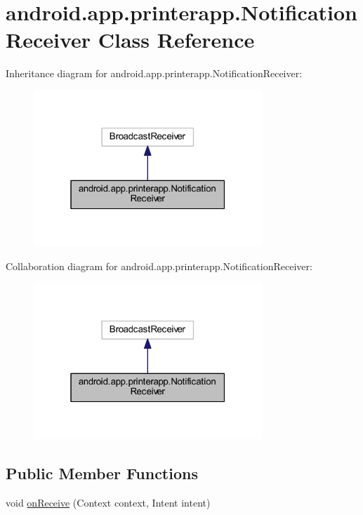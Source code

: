 \hypertarget{classandroid_1_1app_1_1printerapp_1_1_notification_receiver}{}\section{android.\+app.\+printerapp.\+Notification\+Receiver Class Reference}
\label{classandroid_1_1app_1_1printerapp_1_1_notification_receiver}


Inheritance diagram for android.\+app.\+printerapp.\+Notification\+Receiver\+:
\nopagebreak
\begin{figure}[H]
\begin{center}
\leavevmode
\includegraphics[width=244pt]{classandroid_1_1app_1_1printerapp_1_1_notification_receiver__inherit__graph}
\end{center}
\end{figure}


Collaboration diagram for android.\+app.\+printerapp.\+Notification\+Receiver\+:
\nopagebreak
\begin{figure}[H]
\begin{center}
\leavevmode
\includegraphics[width=244pt]{classandroid_1_1app_1_1printerapp_1_1_notification_receiver__coll__graph}
\end{center}
\end{figure}
\subsection*{Public Member Functions}
\begin{DoxyCompactItemize}
\item 
void \hyperlink{classandroid_1_1app_1_1printerapp_1_1_notification_receiver_acaa678788162ce1dd9094ae402c435da}{on\+Receive} (Context context, Intent intent)
\end{DoxyCompactItemize}
